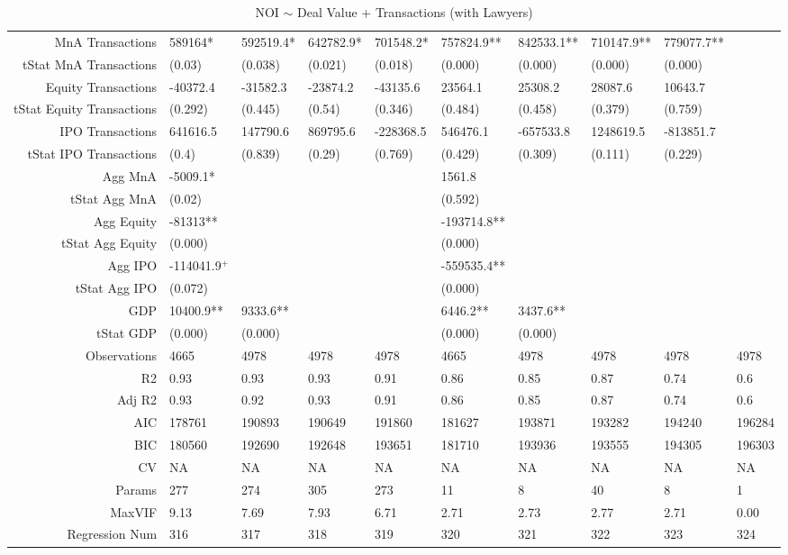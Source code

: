 \begin{table}[ht]
\begin{tabular}{rlllllllll}
  MnA Transactions & 589164* & 592519.4* & 642782.9* & 701548.2* & 757824.9** & 842533.1** & 710147.9** & 779077.7** &  \\ 
  tStat MnA Transactions & (0.03) & (0.038) & (0.021) & (0.018) & (0.000) & (0.000) & (0.000) & (0.000) &  \\ 
  Equity Transactions & -40372.4 & -31582.3 & -23874.2 & -43135.6 & 23564.1 & 25308.2 & 28087.6 & 10643.7 &  \\ 
  tStat Equity Transactions & (0.292) & (0.445) & (0.54) & (0.346) & (0.484) & (0.458) & (0.379) & (0.759) &  \\ 
  IPO Transactions & 641616.5 & 147790.6 & 869795.6 & -228368.5 & 546476.1 & -657533.8 & 1248619.5 & -813851.7 &  \\ 
  tStat IPO Transactions & (0.4) & (0.839) & (0.29) & (0.769) & (0.429) & (0.309) & (0.111) & (0.229) &  \\ 
  Agg MnA & -5009.1* &  &  &  & 1561.8 &  &  &  &  \\ 
  tStat Agg MnA & (0.02) &  &  &  & (0.592) &  &  &  &  \\ 
  Agg Equity & -81313** &  &  &  & -193714.8** &  &  &  &  \\ 
  tStat Agg Equity & (0.000) &  &  &  & (0.000) &  &  &  &  \\ 
  Agg IPO & -114041.9$^{+}$ &  &  &  & -559535.4** &  &  &  &  \\ 
  tStat Agg IPO & (0.072) &  &  &  & (0.000) &  &  &  &  \\ 
  GDP & 10400.9** & 9333.6** &  &  & 6446.2** & 3437.6** &  &  &  \\ 
  tStat GDP & (0.000) & (0.000) &  &  & (0.000) & (0.000) &  &  &  \\ 
  Observations & 4665 & 4978 & 4978 & 4978 & 4665 & 4978 & 4978 & 4978 & 4978 \\ 
  R2 & 0.93 & 0.93 & 0.93 & 0.91 & 0.86 & 0.85 & 0.87 & 0.74 & 0.6 \\ 
  Adj R2 & 0.93 & 0.92 & 0.93 & 0.91 & 0.86 & 0.85 & 0.87 & 0.74 & 0.6 \\ 
  AIC & 178761 & 190893 & 190649 & 191860 & 181627 & 193871 & 193282 & 194240 & 196284 \\ 
  BIC & 180560 & 192690 & 192648 & 193651 & 181710 & 193936 & 193555 & 194305 & 196303 \\ 
  CV & NA & NA & NA & NA & NA & NA & NA & NA & NA \\ 
  Params & 277 & 274 & 305 & 273 & 11 & 8 & 40 & 8 & 1 \\ 
  MaxVIF & 9.13 & 7.69 & 7.93 & 6.71 & 2.71 & 2.73 & 2.77 & 2.71 & 0.00 \\ 
  Regression Num & 316 & 317 & 318 & 319 & 320 & 321 & 322 & 323 & 324 \\ 
   \hline
\end{tabular}
\caption{NOI $\sim$ Deal Value + Transactions (with Lawyers)} 
\end{table}
